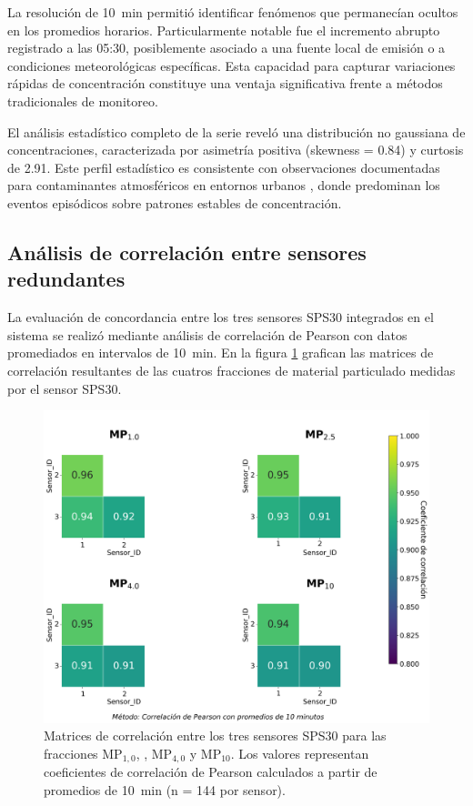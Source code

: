 La resolución de \SI{10}{\minute} permitió identificar fenómenos que permanecían ocultos en los promedios horarios. Particularmente notable fue el incremento abrupto registrado a las 05:30, posiblemente asociado a una fuente local de emisión o a condiciones meteorológicas específicas. Esta capacidad para capturar variaciones rápidas de concentración constituye una ventaja significativa frente a métodos tradicionales de monitoreo.

El análisis estadístico completo de la serie reveló una distribución no gaussiana de concentraciones, caracterizada por asimetría positiva (skewness = \SI{0.84}{}) y curtosis de \SI{2.91}{}. Este perfil estadístico es consistente con observaciones documentadas para contaminantes atmosféricos en entornos urbanos \citep{Owczarek2023}, donde predominan los eventos episódicos sobre patrones estables de concentración.



\subsection{Análisis de correlación entre sensores redundantes}

La evaluación de concordancia entre los tres sensores SPS30 integrados en el sistema se realizó mediante análisis de correlación de Pearson con datos promediados en intervalos de \SI{10}{\minute}. En la figura \ref{fig:pm25correlacion} grafican las matrices de correlación resultantes de las cuatros fracciones de material particulado medidas por el sensor SPS30.

\begin{figure}[!hbp]
	\centering
	\includegraphics[width=0.9\linewidth]{Figures/pm25_correlacion}
	\caption{Matrices de correlación entre los tres sensores SPS30 para las fracciones MP$_{1,0}$, \MPF, MP$_{4,0}$ y MP$_{10}$. Los valores representan coeficientes de correlación de Pearson calculados a partir de promedios de \SI{10}{\minute} (n = 144 por sensor).}
	\label{fig:pm25correlacion}
\end{figure}

